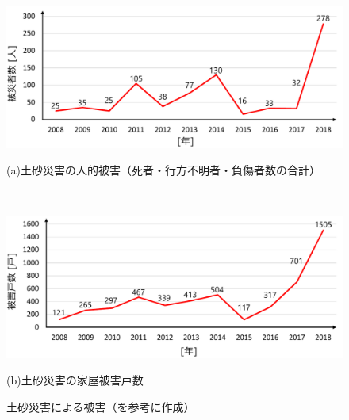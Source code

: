 \begin{figure}[b]
	\begin{center}

		\begin{minipage}[b]{\linewidth}
		\centering
		\includegraphics[width=12.5cm]{./Ch1_Introduction/Fig/土砂災害の人的被害_compressed.pdf}
		\vspace{-2mm}
		\caption*{(a)土砂災害の人的被害（死者・行方不明者・負傷者数の合計）} 
		\end{minipage}\\

		\begin{minipage}[b]{\linewidth}
		\centering
		\includegraphics[width=12.5cm]{./Ch1_Introduction/Fig/土砂災害の家屋被害戸数_compressed.pdf}
		\vspace{-2mm}
		\caption*{(b)土砂災害の家屋被害戸数} 
		\end{minipage}
	
	\caption{土砂災害による被害（\cite{国交省2019}を参考に作成）}\label{fig:LandslideDamage}
	\end{center}
\end{figure}

\clearpage

